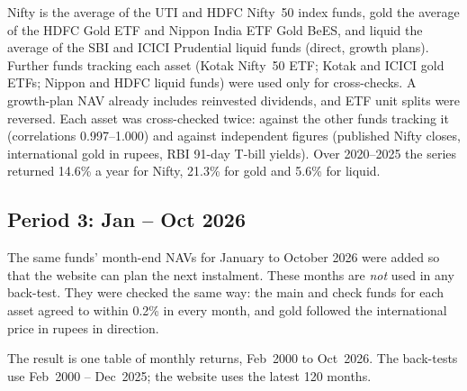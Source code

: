 Nifty is the average of the UTI and HDFC Nifty~50 index funds, gold the average of the HDFC Gold ETF and Nippon India ETF Gold BeES, and liquid the average of the SBI and ICICI Prudential liquid funds (direct, growth plans). Further funds tracking each asset (Kotak Nifty~50 ETF; Kotak and ICICI gold ETFs; Nippon and HDFC liquid funds) were used only for cross-checks. A growth-plan NAV already includes reinvested dividends, and ETF unit splits were reversed. Each asset was cross-checked twice: against the other funds tracking it (correlations 0.997--1.000) and against independent figures (published Nifty closes, international gold in rupees, RBI 91-day T-bill yields). Over 2020--2025 the series returned 14.6\% a year for Nifty, 21.3\% for gold and 5.6\% for liquid.

\subsection{Period 3: Jan -- Oct 2026}

The same funds' month-end NAVs for January to October 2026 were added so that the website can plan
the next instalment. These months are \emph{not} used in any back-test. They were checked the same
way: the main and check funds for each asset agreed to within 0.2\% in every month, and gold followed
the international price in rupees in direction.

The result is one table of monthly returns, Feb~2000 to Oct~2026. The back-tests use Feb~2000 -- Dec~2025; the website uses the latest 120 months.
